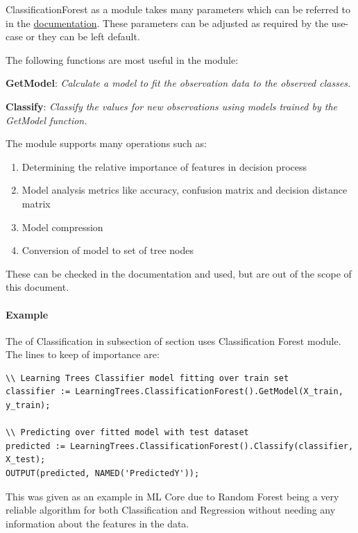 ClassificationForest as a module takes many parameters which can be referred to in the \href{https://cdn.hpccsystems.com/pdf/ml/LearningTrees.pdf}{documentation}. These parameters can be adjusted as required by the use-case or they can be left default. 

The following functions are most useful in the module:

\textbf{GetModel}: \textit{Calculate a model to fit the observation data to the observed classes.}

\textbf{Classify}: \textit{Classify the values for new observations using models trained by the GetModel function.}

The module supports many operations such as: 

\begin{enumerate}
    \item Determining the relative importance of features in decision process
    \item Model analysis metrics like accuracy, confusion matrix and decision distance matrix
    \item Model compression
    \item Conversion of model to set of tree nodes
\end{enumerate}

These can be checked in the documentation and used, but are out of the scope of this document.

\paragraph{Example}

The  of Classification in  subsection of section  uses Classification Forest module. The lines to keep of importance are:

\begin{lstlisting}
\\ Learning Trees Classifier model fitting over train set
classifier := LearningTrees.ClassificationForest().GetModel(X_train, y_train);

\\ Predicting over fitted model with test dataset
predicted := LearningTrees.ClassificationForest().Classify(classifier, X_test);
OUTPUT(predicted, NAMED('PredictedY'));
\end{lstlisting}

This was given as an example in ML Core due to Random Forest being a very reliable algorithm for both Classification and Regression without needing any information about the features in the data.

